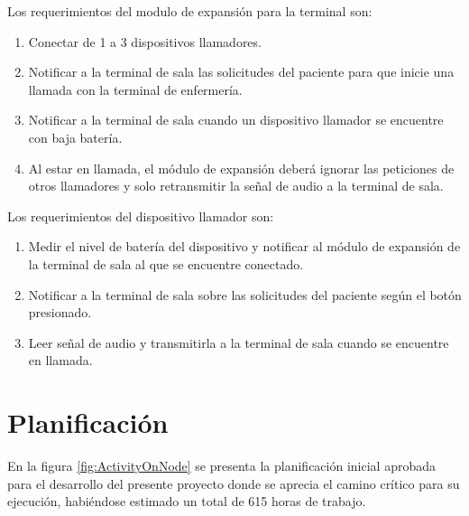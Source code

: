 Los requerimientos del  modulo de expansión para la terminal son:

\begin{enumerate}

\item Conectar de 1 a 3 dispositivos llamadores.

\item Notificar a la terminal de sala las solicitudes del paciente para que inicie una llamada con la terminal de enfermería.

\item Notificar a la terminal de sala cuando un dispositivo llamador se encuentre con baja batería.

\item Al estar en llamada, el módulo de expansión deberá ignorar las peticiones de otros llamadores y solo retransmitir la señal de audio a la terminal de sala.

\end{enumerate}

Los requerimientos del dispositivo llamador son:

\begin{enumerate}

\item Medir el nivel de batería del dispositivo y notificar al módulo de expansión de la terminal de sala al que se encuentre conectado.

\item Notificar a la terminal de sala sobre las solicitudes del paciente según el botón presionado.

\item Leer señal de audio y transmitirla a la terminal de sala cuando se encuentre en llamada.

\end{enumerate}

\section{Planificación}

En la figura \ref{fig:ActivityOnNode} se presenta la planificación inicial aprobada para el desarrollo del presente proyecto donde se aprecia el camino crítico para su ejecución, habiéndose estimado un total de 615 horas de trabajo.

